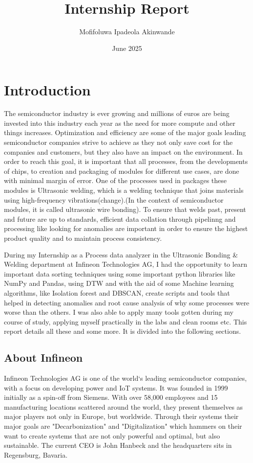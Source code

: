 \documentclass{article}
\title{Internship Report}
\author{Mofifoluwa Ipadeola Akinwande}
\date{June 2025}
\begin{document}
\maketitle

\section{Introduction}
The semiconductor industry is ever growing and millions of euros are being invested into this industry each year as the need for more compute and other things increases. Optimization and efficiency are some of the major goals leading semiconductor companies strive to achieve as they not only save cost for the companies and customers, but they also have an impact on the environment. In order to reach this goal, it is important that all processes, from the developments of chips, to creation and packaging of modules for different use cases, are done with minimal margin of error. One of the processes used in packages these modules is Ultrasonic welding, which is a welding technique that joins materials using high-frequency vibrations(change).(In the context of semiconductor modules, it is called ultrasonic wire bonding). To ensure that welds past, present and future are up to standards, efficient data collation through pipelinng and processing like looking for anomalies are important in order to ensure the highest product quality and to maintain process consistency.

During my Internship as a Process data analyzer in the Ultrasonic Bonding \& Welding department at Infineon Technologies AG, I had the opportunity to learn important data sorting techniques using some important python libraries like NumPy and Pandas, using DTW and with the aid of some Machine learning algorithms, like Isolation forest and DBSCAN, create scripts and tools that helped in detecting anomalies and root cause analysis of why some processes were worse than the others. 
I was also able to apply many tools gotten during my course of study, applying myself practically in the labs and clean rooms etc.
This report details all these and some more. It is divided into the following sections.

\subsection{About Infineon}
Infineon Technologies AG is one of the world`s leading semiconductor companies, with a focus on developing power and IoT systems. It was founded in 1999 initially as a spin-off from Siemens. With over 58,000 employees and 15 manufacturing locations scattered around the world, they present themselves as major players not only in Europe, but worldwide. Through their systems their major goals are "Decarbonization" and "Digitalization" which hammers on their want to create systems that are not only powerful and optimal, but also sustainable. The current CEO is John Hanbeck and the headquarters sits in Regensburg, Bavaria.
\end{document}
